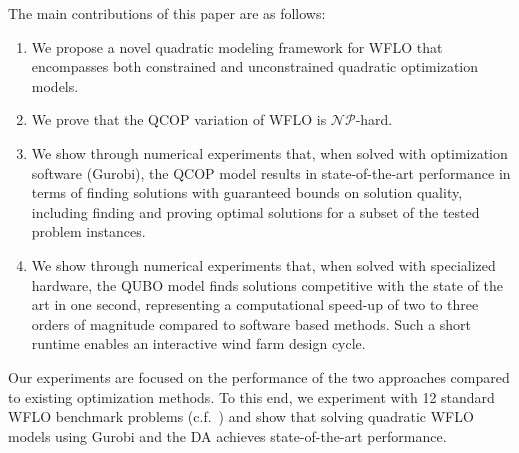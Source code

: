 \documentclass[preprint,12pt]{elsarticle}
\begin{document}
The main
contributions of this paper are as follows:
\begin{enumerate} 
\item We propose a novel quadratic modeling framework for WFLO that encompasses both constrained and unconstrained quadratic optimization models.
\item We prove that the QCOP variation of WFLO is $\mathcal{NP}$-hard.

\item We show through numerical experiments that, when solved with optimization software (Gurobi), the QCOP model results in state-of-the-art performance in terms of finding solutions with guaranteed bounds on solution quality, including finding and proving optimal solutions for a subset of the tested problem instances.

\item We show through numerical experiments that, when solved with specialized hardware, the QUBO model finds solutions competitive with the state of the art in one second, representing a computational speed-up of two to three orders of magnitude compared to software based methods. Such a short runtime enables an interactive wind farm design cycle.
  

\end{enumerate}

Our experiments are focused on the performance of the two approaches
compared to 
existing optimization methods. To this end,
we experiment with 12 standard WFLO benchmark problems (c.f.~\cite{turner2014new})
and show that solving quadratic WFLO models
using Gurobi and the DA
achieves state-of-the-art performance.


\end{document}
